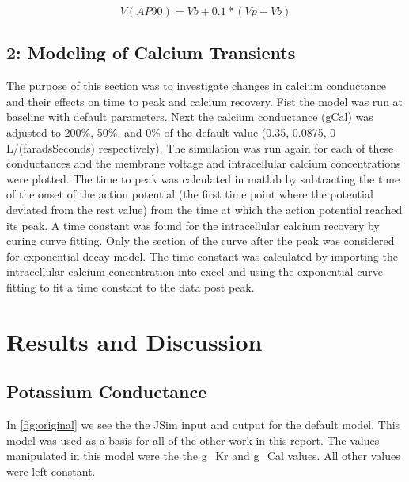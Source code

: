 \documentclass[11pt]{article}
\begin{document}
\begin{equation} 
V(AP90) = Vb + 0.1*(Vp-Vb)
\label{eq:ap90}
\end{equation}


\subsection{2: Modeling of Calcium Transients}
\par{}
The purpose of this section was to investigate changes in calcium conductance and their effects on time to peak and calcium recovery. Fist the model was run at baseline with default parameters. Next the calcium conductance (gCal) was adjusted to 200\%, 50\%, and 0\% of the default value (0.35, 0.0875, 0
L/(faradsSeconds) respectively). The simulation was run again for each of these conductances and the membrane voltage and intracellular calcium concentrations were plotted. The time to peak was calculated in matlab by subtracting the time of the onset of the action potential (the first time point where the potential deviated from the rest value) from the time at which the action potential reached its peak. A time constant was found for the intracellular calcium recovery by curing curve fitting. Only the section of the curve after the peak was considered for exponential decay model. The time constant was calculated by importing the intracellular calcium concentration into excel and using the exponential curve fitting to fit a time constant to the data post peak.

\section{Results and Discussion}
\subsection{Potassium Conductance}
\par{}
In \ref{fig:original} we see the the JSim input and output for the default model. This model was used as a basis for all of the other work in this report. The values manipulated in this model were the the g\_Kr and g\_Cal values. All other values were left constant.
\end{document}
